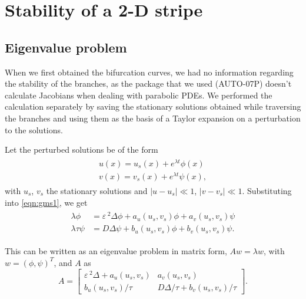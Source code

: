 \documentclass[a4paper,10pt]{article}
\newcommand{\De}{\ensuremath{\Delta}}
\newcommand{\lA}{\ensuremath{\lambda}}
\newcommand{\Ep}{\ensuremath{\varepsilon\,}}
\begin{document}
\section{Stability of a 2-D stripe}

\subsection{Eigenvalue problem}

When we first obtained the bifurcation curves, we had no information regarding the stability of the branches, as the package that we used (AUTO-07P) doesn't calculate Jacobians when dealing with parabolic PDEs. We performed the calculation separately by saving the stationary solutions obtained while traversing the branches and using them as the basis of a Taylor expansion on a perturbation to the solutions.

Let the perturbed solutions be of the form
% 
\begin{equation}
\label{eqn:gms_eigs}
\begin{split}
\begin{aligned}
u(x) = u_s(x) + e^{\lA t}\phi(x)\\
v(x) = v_s(x) + e^{\lA t}\psi(x),
\end{aligned}
\end{split}
\end{equation}
% 
with $u_s$, $v_s$ the stationary solutions and $|u-u_s|\ll 1$, $|v-v_s|\ll 1$. Substituting into \eqref{eqn:gms1}, we get
% 
\begin{equation}
\label{eqn:gms2}
\begin{split}
\begin{aligned}
	\lA \phi &= \Ep^2\De \phi + a_u(u_s,v_s)\phi + a_v(u_s,v_s)\psi \\
	\lA\tau \psi &= D\De \psi + b_u(u_s,v_s)\phi + b_v(u_s,v_s)\psi.
\end{aligned}
\end{split}
\end{equation}

This can be written as an eigenvalue problem in matrix form, $Aw = \lA w$, with $w = (\phi,\psi)^T$, and $A$ as
% 
\begin{equation}
\label{eqn:Amatrix}
  A =
	\begin{bmatrix}
		\Ep^2\De + a_u(u_s,v_s)& a_v(u_s,v_s) \\
		b_u(u_s,v_s)/\tau& D\De/\tau + b_v(u_s,v_s)/\tau
  \end{bmatrix}.
\end{equation}
\end{document}
